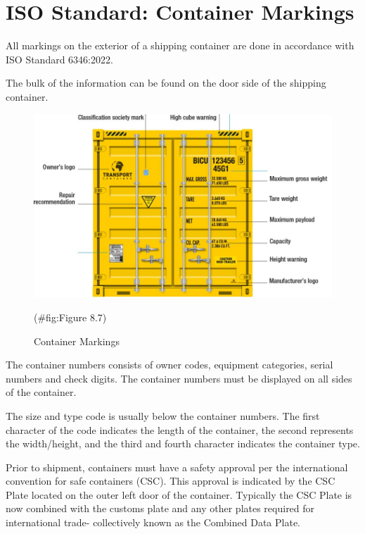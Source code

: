 \documentclass[
]{book}
\begin{document}
\hypertarget{seaport-markings}{%
\section{ISO Standard: Container Markings}\label{seaport-markings}}

All markings on the exterior of a shipping container are done in accordance with ISO Standard 6346:2022.

The bulk of the information can be found on the door side of the shipping container.

\begin{figure}

{\centering \includegraphics{./Images/seaport operation/Container Markings} 

}

\caption{Container Markings}(\#fig:Figure 8.7)
\end{figure}

The container numbers consists of owner codes, equipment categories, serial numbers and check digits. The container numbers must be displayed on all sides of the container.

The size and type code is usually below the container numbers. The first character of the code indicates the length of the container, the second represents the width/height, and the third and fourth character indicates the container type.

Prior to shipment, containers must have a safety approval per the international convention for safe containers (CSC). This approval is indicated by the CSC Plate located on the outer left door of the container. Typically the CSC Plate is now combined with the customs plate and any other plates required for international trade- collectively known as the Combined Data Plate.
\end{document}

